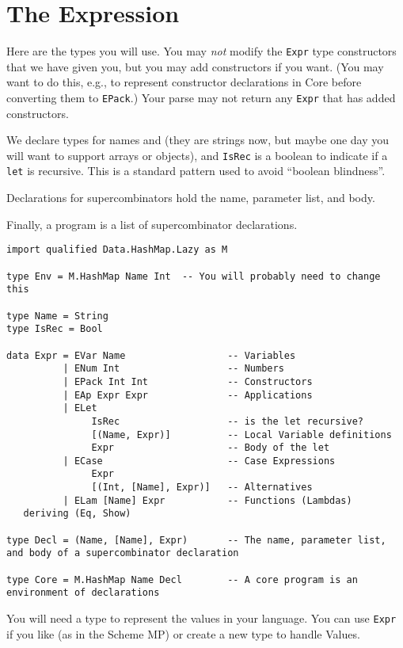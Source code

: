 \documentclass[11pt]{article}
\begin{document}
\section{The Expression}
\label{sec:org36343b7}

Here are the types you will use. You may \emph{not} modify the \texttt{Expr} type constructors that we have given you, but you
may add constructors if you want.   (You may want to do this, e.g., to represent constructor declarations in Core before
converting them to \texttt{EPack}.)  Your parse may not return any \texttt{Expr} that has added constructors.

We declare types for names and (they are strings now, but maybe one day you will want to support arrays or objects),
and \texttt{IsRec} is a boolean to indicate if a \texttt{let} is recursive.  This is a standard pattern used to avoid ``boolean blindness''.

Declarations for supercombinators hold the name, parameter list, and body.

Finally, a program is a list of supercombinator declarations.

\begin{verbatim}
import qualified Data.HashMap.Lazy as M

type Env = M.HashMap Name Int  -- You will probably need to change this

type Name = String
type IsRec = Bool

data Expr = EVar Name                  -- Variables
          | ENum Int                   -- Numbers
          | EPack Int Int              -- Constructors
          | EAp Expr Expr              -- Applications
          | ELet
               IsRec                   -- is the let recursive?
               [(Name, Expr)]          -- Local Variable definitions
               Expr                    -- Body of the let
          | ECase                      -- Case Expressions
               Expr
               [(Int, [Name], Expr)]   -- Alternatives
          | ELam [Name] Expr           -- Functions (Lambdas)
   deriving (Eq, Show)

type Decl = (Name, [Name], Expr)       -- The name, parameter list, and body of a supercombinator declaration

type Core = M.HashMap Name Decl        -- A core program is an environment of declarations
\end{verbatim}

You will need a type to represent the values in your language.  You can use \texttt{Expr} if you like (as in the Scheme MP) or create a new
type to handle Values.
\end{document}
